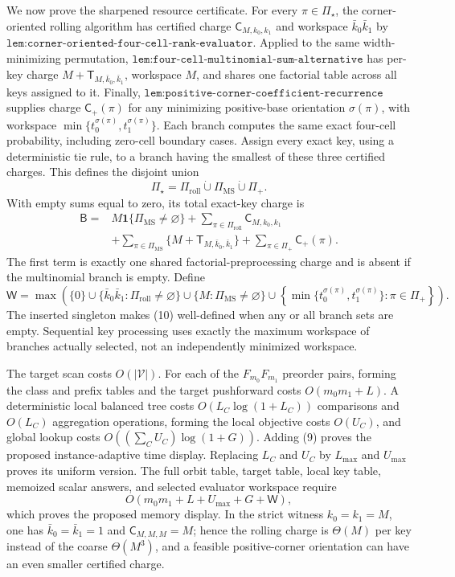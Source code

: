 We now prove the sharpened resource certificate. For every \(\pi\in\Pi_\star\), the corner-oriented rolling algorithm has certified charge \(\mathsf C_{M,k_0,k_1}\) and workspace \(\bar k_0\bar k_1\) by \(\texttt{lem:corner-oriented-four-cell-rank-evaluator}\). Applied to the same width-minimizing permutation, \(\texttt{lem:four-cell-multinomial-sum-alternative}\) has per-key charge \(M+\mathsf T_{M,\bar k_0,\bar k_1}\), workspace \(M\), and shares one factorial table across all keys assigned to it. Finally, \(\texttt{lem:positive-corner-coefficient-recurrence}\) supplies charge \(\mathsf C_+(\pi)\) for any minimizing positive-base orientation \(\sigma(\pi)\), with workspace \(\min\{t_0^{\sigma(\pi)},t_1^{\sigma(\pi)}\}\). Each branch computes the same exact four-cell probability, including zero-cell boundary cases. Assign every exact key, using a deterministic tie rule, to a branch having the smallest of these three certified charges. This defines the disjoint union
\[\Pi_\star=\Pi_{\mathrm{roll}}\mathbin{\dot\cup}\Pi_{\mathrm{MS}}\mathbin{\dot\cup}\Pi_+.\tag{8}\]
With empty sums equal to zero, its total exact-key charge is
\[\begin{aligned}\mathsf B={}&M\mathbf 1\{\Pi_{\mathrm{MS}}\ne\varnothing\}+\sum_{\pi\in\Pi_{\mathrm{roll}}}\mathsf C_{M,k_0,k_1}\\&+\sum_{\pi\in\Pi_{\mathrm{MS}}}\{M+\mathsf T_{M,\bar k_0,\bar k_1}\}+\sum_{\pi\in\Pi_+}\mathsf C_+(\pi).\end{aligned}\tag{9}\]
The first term is exactly one shared factorial-preprocessing charge and is absent if the multinomial branch is empty. Define
\[\mathsf W=\max\!\left(\{0\}\cup\{\bar k_0\bar k_1:\Pi_{\mathrm{roll}}\ne\varnothing\}\cup\{M:\Pi_{\mathrm{MS}}\ne\varnothing\}\cup\left\{\min\{t_0^{\sigma(\pi)},t_1^{\sigma(\pi)}\}:\pi\in\Pi_+\right\}\right).\tag{10}\]
The inserted singleton makes (10) well-defined when any or all branch sets are empty. Sequential key processing uses exactly the maximum workspace of branches actually selected, not an independently minimized workspace.

The target scan costs \(O(|\mathcal V|)\). For each of the \(F_{m_0}F_{m_1}\) preorder pairs, forming the class and prefix tables and the target pushforward costs \(O(m_0m_1+L)\). A deterministic local balanced tree costs \(O(L_C\log(1+L_C))\) comparisons and \(O(L_C)\) aggregation operations, forming the local objective costs \(O(U_C)\), and global lookup costs \(O((\sum_CU_C)\log(1+G))\). Adding (9) proves the proposed instance-adaptive time display. Replacing \(L_C\) and \(U_C\) by \(L_{\max}\) and \(U_{\max}\) proves its uniform version. The full orbit table, target table, local key table, memoized scalar answers, and selected evaluator workspace require
\[O(m_0m_1+L+U_{\max}+G+\mathsf W),\]
which proves the proposed memory display. In the strict witness \(k_0=k_1=M\), one has \(\bar k_0=\bar k_1=1\) and \(\mathsf C_{M,M,M}=M\); hence the rolling charge is \(\Theta(M)\) per key instead of the coarse \(\Theta(M^3)\), and a feasible positive-corner orientation can have an even smaller certified charge.